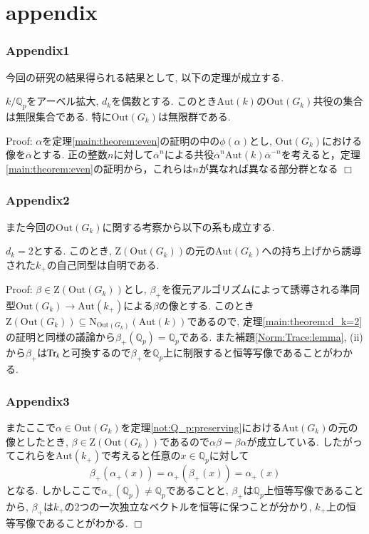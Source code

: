 \documentclass[dvipdfmx,19.8pt]{beamer}
\newcommand{\Blue}{\color{blue}}
\def\qed{\hfill $\Box$}
\theoremstyle{theorem}
\theoremstyle{definition}
\def\bQ{{\mathbb Q}}
\def\Aut{{\mathrm{Aut}}}
\def\Out{{\mathrm{Out}}}
\begin{document}
\section{appendix}

\begin{frame}[fragile]
	\frametitle{Appendix1}
今回の研究の結果得られる結果として, 以下の定理が成立する. 
\begin{theorem}
$k/\bQ_p$をアーベル拡大, $d_k$を偶数とする. このとき$\Aut(k)$の$\Out(G_k)$共役の集合は無限集合である. 特に$\Out(G_k)$は無限群である. 
\end{theorem}

{\Blue Proof:}
$\alpha$を定理\ref{main:theorem:even}の証明の中の$\phi(\alpha)$とし, $\Out(G_k)$における像を$\overline{\alpha}$とする. 正の整数$n$に対して$\overline{\alpha}^n$による共役$\overline{\alpha}^n \Aut(k) \overline{\alpha}^{-n}$を考えると，定理\ref{main:theorem:even}の証明から，これらは$n$が異なれば異なる部分群となる \qed


\end{frame}





\begin{frame}[fragile]
	\frametitle{Appendix2}

また今回の$\Out(G_k)$に関する考察から以下の系も成立する. 
\begin{corollary}
$d_k=2$とする. このとき, $\mathrm{Z}(\Out(G_k))$の元の$\Aut(G_k)$への持ち上げから誘導された$k_+$の自己同型は自明である. 
\end{corollary}

{\Blue Proof:}
$\beta \in \mathrm{Z}(\Out(G_k))$とし, $\beta_+$を復元アルゴリズムによって誘導される準同型$\Out(G_k) \rightarrow \Aut(k_+)$による$\beta$の像とする. このとき$\mathrm{Z}(\Out(G_k)) \subseteq \mathrm{N}_{\Out(G_k)}(\Aut(k))$であるので, 定理\ref{main:theorem:d_k=2}の証明と同様の議論から$\beta_+(\bQ_p) = \bQ_p$である. また補題\ref{Norm:Trace:lemma}, (ii)から$\beta_+$は${\rm Tr}_k$と可換するので$\beta_+$を$\bQ_p$上に制限すると恒等写像であることがわかる. 



\end{frame}


\begin{frame}[fragile]
	\frametitle{Appendix3}

またここで$\alpha \in \Out(G_k)$を定理\ref{not:Q_p:preserving}における$\Aut(G_k)$の元の像としたとき, $\beta \in \mathrm{Z}(\Out(G_k))$であるので$\alpha \beta = \beta \alpha$が成立している. したがってこれらを$\Aut(k_+)$で考えると任意の$x \in \bQ_p$に対して
\[
\beta_+(\alpha_+(x))=\alpha_+(\beta_+(x))=\alpha_+(x)
\]
となる. しかしここで$\alpha_+(\bQ_p) \neq \bQ_p$であることと, $\beta_+$は$\bQ_p$上恒等写像であることから, $\beta_+$は$k_+$の2つの一次独立なベクトルを恒等に保つことが分かり, $k_+$上の恒等写像であることがわかる. 
\qed
\end{frame}
\end{document}
